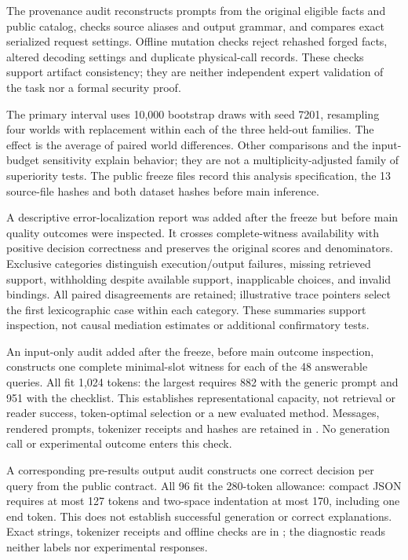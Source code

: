 The provenance audit reconstructs prompts from the original eligible facts and public catalog, checks source aliases and output grammar, and compares exact serialized request settings. Offline mutation checks reject rehashed forged facts, altered decoding settings and duplicate physical-call records. These checks support artifact consistency; they are neither independent expert validation of the task nor a formal security proof.

The primary interval uses 10,000 bootstrap draws with seed 7201, resampling four worlds with replacement within each of the three held-out families. The effect is the average of paired world differences. Other comparisons and the input-budget sensitivity explain behavior; they are not a multiplicity-adjusted family of superiority tests. The public freeze files record this analysis specification, the 13 source-file hashes and both dataset hashes before main inference.

A descriptive error-localization report was added after the freeze but before main quality outcomes were inspected. It crosses complete-witness availability with positive decision correctness and preserves the original scores and denominators. Exclusive categories distinguish execution/output failures, missing retrieved support, withholding despite available support, inapplicable choices, and invalid bindings. All paired disagreements are retained; illustrative trace pointers select the first lexicographic case within each category. These summaries support inspection, not causal mediation estimates or additional confirmatory tests.

An input-only audit added after the freeze, before main outcome inspection, constructs one complete minimal-slot witness for each of the 48 answerable queries. All fit 1,024 tokens: the largest requires 882 with the generic prompt and 951 with the checklist. This establishes representational capacity, not retrieval or reader success, token-optimal selection or a new evaluated method. Messages, rendered prompts, tokenizer receipts and hashes are retained in . No generation call or experimental outcome enters this check.

A corresponding pre-results output audit constructs one correct decision per query from the public contract. All 96 fit the 280-token allowance: compact JSON requires at most 127 tokens and two-space indentation at most 170, including one end token. This does not establish successful generation or correct explanations. Exact strings, tokenizer receipts and offline checks are in ; the diagnostic reads neither labels nor experimental responses.

